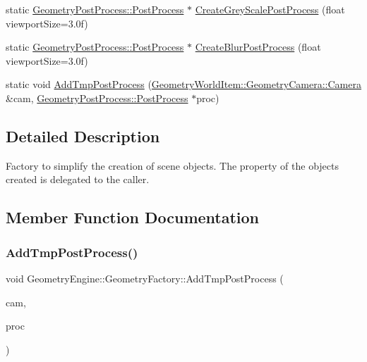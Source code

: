 \begin{DoxyCompactItemize}
\item 
static \mbox{\hyperlink{class_geometry_engine_1_1_geometry_post_process_1_1_post_process}{Geometry\+Post\+Process\+::\+Post\+Process}} $\ast$ \mbox{\hyperlink{class_geometry_engine_1_1_geometry_factory_ae22f129b89273bd47bbb9537901a818a}{Create\+Grey\+Scale\+Post\+Process}} (float viewport\+Size=3.\+0f)
\item 
static \mbox{\hyperlink{class_geometry_engine_1_1_geometry_post_process_1_1_post_process}{Geometry\+Post\+Process\+::\+Post\+Process}} $\ast$ \mbox{\hyperlink{class_geometry_engine_1_1_geometry_factory_afe48a638a03829d843c9ac22f4ba3606}{Create\+Blur\+Post\+Process}} (float viewport\+Size=3.\+0f)
\item 
static void \mbox{\hyperlink{class_geometry_engine_1_1_geometry_factory_a50fd72b5c91709daea566d8f233abb23}{Add\+Tmp\+Post\+Process}} (\mbox{\hyperlink{class_geometry_engine_1_1_geometry_world_item_1_1_geometry_camera_1_1_camera}{Geometry\+World\+Item\+::\+Geometry\+Camera\+::\+Camera}} \&cam, \mbox{\hyperlink{class_geometry_engine_1_1_geometry_post_process_1_1_post_process}{Geometry\+Post\+Process\+::\+Post\+Process}} $\ast$proc)
\end{DoxyCompactItemize}


\subsection{Detailed Description}
Factory to simplify the creation of scene objects. The property of the objects created is delegated to the caller. 

\subsection{Member Function Documentation}
\mbox{\label{class_geometry_engine_1_1_geometry_factory_a50fd72b5c91709daea566d8f233abb23}} 
\subsubsection{\texorpdfstring{AddTmpPostProcess()}{AddTmpPostProcess()}}
{\footnotesize\ttfamily void Geometry\+Engine\+::\+Geometry\+Factory\+::\+Add\+Tmp\+Post\+Process (\begin{DoxyParamCaption}\item[{\mbox{\hyperlink{class_geometry_engine_1_1_geometry_world_item_1_1_geometry_camera_1_1_camera}{Geometry\+World\+Item\+::\+Geometry\+Camera\+::\+Camera}} \&}]{cam,  }\item[{\mbox{\hyperlink{class_geometry_engine_1_1_geometry_post_process_1_1_post_process}{Geometry\+Post\+Process\+::\+Post\+Process}} $\ast$}]{proc }\end{DoxyParamCaption})\hspace{0.3cm}{\ttfamily [static]}}

